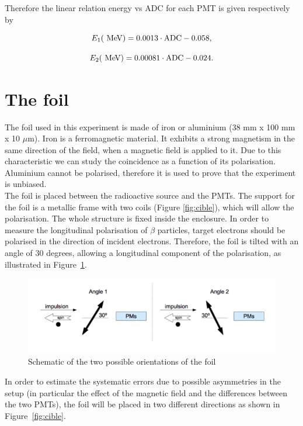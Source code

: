 \documentclass[10pt,swedish, openany]{book}
\def\MeV{\ifmmode {\mathrm{\ Me\kern -0.1em V}}\else
                   \textrm{Me\kern -0.1em V}\fi}%
\begin{document}
Therefore the linear relation energy vs ADC for each PMT is given respectively by

\begin{equation}
    E_1 (\MeV) = 0.0013 \cdot {\rm ADC} - 0.058,
\end{equation}

\begin{equation}
    E_2 (\MeV) = 0.00081 \cdot {\rm ADC} - 0.024.
\end{equation}

\newpage

\section{The foil}

The foil used in this experiment is made of iron or aluminium (38 mm x 100 mm x 10 $\mu$m). Iron is a ferromagnetic material. It exhibits a strong magnetism in the same direction of the field, when a magnetic field is applied to it. Due to this characteristic we can study the coincidence as a function of its polarisation. Aluminium cannot be polarised, therefore it is used to prove that the experiment is unbiased.\\

The foil is placed between the radioactive source and the PMTs. The support for the foil is a metallic frame with two coils (Figure \ref{fig:cible}), which will allow the polarisation. The whole structure is fixed inside the enclosure. In order to measure the longitudinal polarisation of $\beta$ particles, target electrons should be polarised in the direction of incident electrons. Therefore, the foil is tilted with an angle of 30 degrees, allowing a longitudinal component of the polarisation, as illustrated in Figure~\ref{fig:30}.

\begin{figure}[H]
\includegraphics[scale=0.5]{Foil30.png}
\centering
\caption{Schematic of the two possible orientations of the foil}
\label{fig:30}
\end{figure}

In order to estimate the systematic errors due to possible asymmetries in the setup (in particular the effect of the magnetic field and the differences between the two PMTs), the foil will be placed in two different directions as shown in Figure~\ref{fig:cible}. \\
\end{document}
